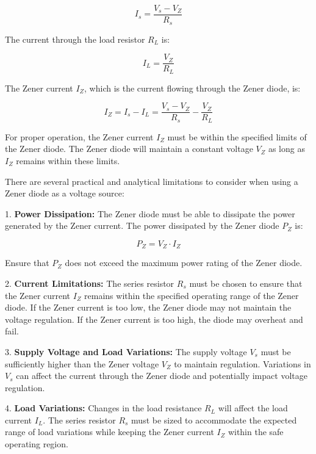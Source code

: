 \documentclass[11pt]{article}
\begin{document}
\begin{question}
{        \[
            I_s = \frac{V_s - V_Z}{R_s}
        \]

        The current through the load resistor \( R_L \) is:

        \[
            I_L = \frac{V_Z}{R_L}
        \]

        The Zener current \( I_Z \), which is the current flowing through the Zener diode, is:

        \[
            I_Z = I_s - I_L = \frac{V_s - V_Z}{R_s} - \frac{V_Z}{R_L}
        \]

        For proper operation, the Zener current \( I_Z \) must be within the specified limits of the Zener diode. The Zener diode will maintain a constant voltage \( V_Z \) as long as \( I_Z \) remains within these limits.

        There are several practical and analytical limitations to
        consider when using a Zener diode as a voltage source:

        1. \textbf{Power Dissipation:}
        The Zener diode must be able to dissipate the power generated by the Zener current. The power dissipated by the Zener diode \( P_Z \) is:

        \[
            P_Z = V_Z \cdot I_Z
        \]

        Ensure that \( P_Z \) does not exceed the maximum power rating of the Zener diode.

        2. \textbf{Current Limitations:}
        The series resistor \( R_s \) must be chosen to ensure that the Zener current \( I_Z \) remains within the specified operating range of the Zener diode. If the Zener current is too low, the Zener diode may not maintain the voltage regulation. If the Zener current is too high, the diode may overheat and fail.

        3. \textbf{Supply Voltage and Load Variations:}
        The supply voltage \( V_s \) must be sufficiently higher than the Zener voltage \( V_Z \) to maintain regulation. Variations in \( V_s \) can affect the current through the Zener diode and potentially impact voltage regulation.

        4. \textbf{Load Variations:}
        Changes in the load resistance \( R_L \) will affect the load current \( I_L \).
        The series resistor \( R_s \) must be sized to accommodate the expected range of load
        variations while keeping the Zener current \( I_Z \) within the safe operating region. \\

}
\end{question}
\end{document}
